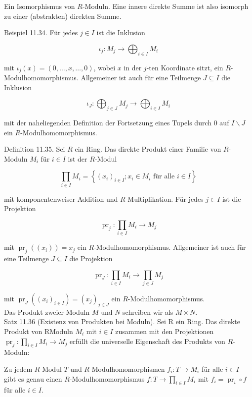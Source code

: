 \documentclass[10pt, letterpaper]{article}
\begin{document}
Ein Isomorphismus von $R$-Moduln. Eine innere direkte Summe ist also isomorph zu einer (abstrakten) direkten Summe.

Beispiel 11.34. Für jedes $j \in I$ ist die Inklusion

$$
\iota_{j}: M_{j} \rightarrow \bigoplus_{i \in I} M_{i}
$$

mit $\iota_{j}(x)=(0, \ldots, x, \ldots, 0)$, wobei $x$ in der $j$-ten Koordinate sitzt, ein $R$-Modulhomomorphismus. Allgemeiner ist auch für eine Teilmenge $J \subseteq I$ die Inklusion

$$
\iota_{J}: \bigoplus_{j \in J} M_{j} \rightarrow \bigoplus_{i \in I} M_{i}
$$

mit der naheliegenden Definition der Fortsetzung eines Tupels durch 0 auf $I \backslash J$ ein $R$-Modulhomomorphismus.

Definition 11.35. Sei $R$ ein Ring. Das direkte Produkt einer Familie von $R$-Moduln $M_{i}$ für $i \in I$ ist der $R$-Modul

$$
\prod_{i \in I} M_{i}=\left\{\left(x_{i}\right)_{i \in I} ; x_{i} \in M_{i} \text { für alle } i \in I\right\}
$$

mit komponentenweiser Addition und $R$-Multiplikation. Für jedes $j \in I$ ist die Projektion

$$
\operatorname{pr}_{j}: \prod_{i \in I} M_{i} \rightarrow M_{j}
$$

mit $\operatorname{pr}_{j}\left(\left(x_{i}\right)\right)=x_{j}$ ein $R$-Modulhomomorphismus. Allgemeiner ist auch für eine Teilmenge $J \subseteq I$ die Projektion

$$
\operatorname{pr}_{J}: \prod_{i \in I} M_{i} \rightarrow \prod_{j \in J} M_{j}
$$

mit $\operatorname{pr}_{J}\left(\left(x_{i}\right)_{i \in I}\right)=\left(x_{j}\right)_{j \in J}$ ein $R$-Modulhomomorphismus.\\
Das Produkt zweier Moduln $M$ und $N$ schreiben wir als $M \times N$.\\
Satz 11.36 (Existenz von Produkten bei Moduln). Sei R ein Ring. Das direkte Produkt von RModuln $M_{i}$ mit $i \in I$ zusammen mit den Projektionen $\operatorname{pr}_{j}: \prod_{i \in I} M_{i} \rightarrow M_{j}$ erfüllt die universelle Eigenschaft des Produkts von $R$-Moduln:

Zu jedem $R$-Modul $T$ und $R$-Modulhomomorphismen $f_{i}: T \rightarrow M_{i}$ für alle $i \in I$ gibt es genau einen $R$-Modulhomomorphismus $f: T \rightarrow \prod_{i \in I} M_{i}$ mit $f_{i}=\operatorname{pr}_{i} \circ f$ für alle $i \in I$.
\end{document}

